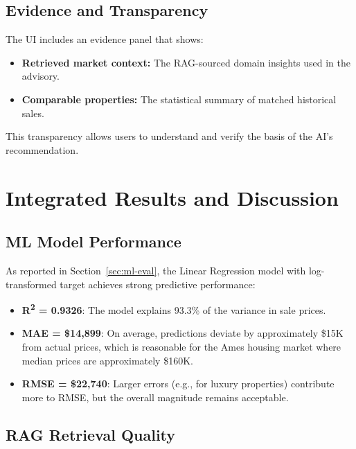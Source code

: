 \documentclass[11pt,a4paper]{article}
\begin{document}
\subsection{Evidence and Transparency}

The UI includes an evidence panel that shows:

\begin{itemize}[leftmargin=*]
    \item \textbf{Retrieved market context:} The RAG-sourced domain insights used in the advisory.
    \item \textbf{Comparable properties:} The statistical summary of matched historical sales.
\end{itemize}

This transparency allows users to understand and verify the basis of the AI's recommendation.

\section{Integrated Results and Discussion}

\subsection{ML Model Performance}

As reported in Section~\ref{sec:ml-eval}, the Linear Regression model with log-transformed target achieves strong predictive performance:

\begin{itemize}[leftmargin=*]
    \item \textbf{R\textsuperscript{2} = 0.9326}: The model explains 93.3\% of the variance in sale prices.
    \item \textbf{MAE = \$14,899}: On average, predictions deviate by approximately \$15K from actual prices, which is reasonable for the Ames housing market where median prices are approximately \$160K.
    \item \textbf{RMSE = \$22,740}: Larger errors (e.g., for luxury properties) contribute more to RMSE, but the overall magnitude remains acceptable.
\end{itemize}

\subsection{RAG Retrieval Quality}
\end{document}
